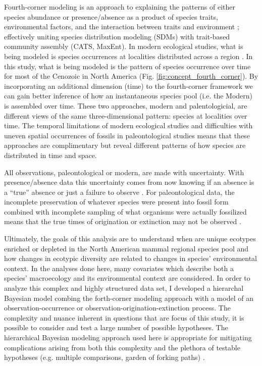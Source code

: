 \documentclass[12pt,letterpaper]{article}
\begin{document}
Fourth-corner modeling is an approach to explaining the patterns of either species abundance or presence/absence as a product of species traits, environmental factors, and the interaction between traits and environment \citep{Brown2014c,Warton2015a,Pollock2012,Jamil2013}; effectively uniting species distribution modeling (SDMs) with trait-based community assembly (CATS, MaxEnt). In modern ecological studies, what is being modeled is species occurrences at localities distributed across a region \citep{Pollock2012,Jamil2013}. In this study, what is being modeled is the pattern of species occurrence over time for most of the Cenozoic in North America (Fig. \ref{fig:concept_fourth_corner}). By incorporating an additional dimension (time) to the fourth-corner framework we can gain better inference of how an instantaneous species pool (i.e. the Modern) is assembled over time. These two approaches, modern and palentologicial, are different views of the same three-dimensional pattern: species at localities over time. The temporal limitations of modern ecological studies and difficulties with uneven spatial occurrences of fossils in paleontological studies means that these approaches are complimentary but reveal different patterns of how species are distributed in time and space.

All observations, paleontological or modern, are made with uncertainty. With presence/absence data this uncertainty comes from now knowing if an absence is a ``true'' absence or just a failure to observe \citep{Royle2008,Royle2005,Foote1999a,Foote2001,Lloyd2011,Wang2016b}. For paleontological data, the incomplete preservation of whatever species were present into fossil form combined with incomplete sampling of what organisms were actually fossilized means that the true times of origination or extinction may not be observed \citep{Foote1999a,Foote2001,Wang2015,Wang2016b}.

Ultimately, the goals of this analysis are to understand when are unique ecotypes enriched or depleted in the North American mammal regional species pool and how changes in ecotypic diversity are related to changes in species' environmental context. In the analyses done here, many covariates which describe both a species' macroecology and its environmental context are considered. In order to analyze this complex and highly structured data set, I developed a hierarchal Bayesian model combing the forth-corner modeling approach with a model of an observation-occurrence or observation-origination-extinction process. The complexity and nuance inherent in questions that are focus of this study, it is possible to consider and test a large number of possible hypotheses. The hierarchical Bayesian modeling approach used here is appropriate for mitigating complications arising from both this complexity and the plethora of testable hypotheses (e.g. multiple comparisons, garden of forking paths) \citep{Gelman2013d,Gelman2012a,Gelman2014}.
\end{document}
